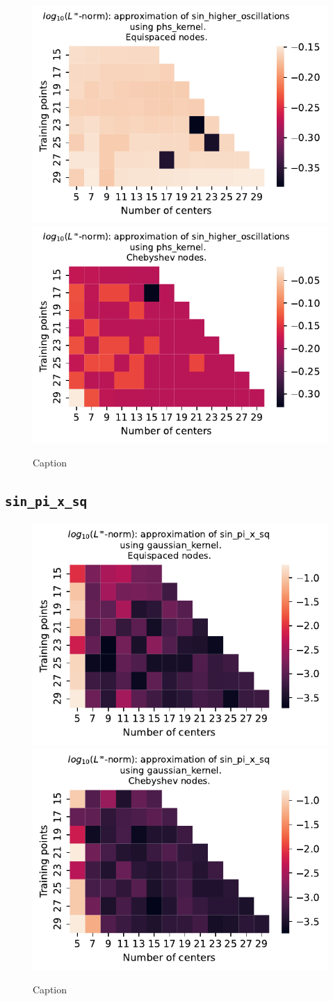 \documentclass[12pt]{report} %
\begin{document}
\begin{figure}[ht]
  \centering

  \includegraphics[width=.49\textwidth]{imagenes/experiments/1d/variational/sin_higher_oscillations-Kphs_kernel-Equi.pdf}
  \includegraphics[width=.49\textwidth]{imagenes/experiments/1d/variational/sin_higher_oscillations-Kphs_kernel-Cheb.pdf}
  \caption{Caption}
  \label{fig:sin-higher-oscillations-phs}
\end{figure}

\subsection*{\texttt{sin\_pi\_x\_sq}}

\begin{figure}[ht]
  \centering

  \includegraphics[width=.49\textwidth]{imagenes/experiments/1d/variational/sin_pi_x_sq-Kgaussian_kernel-Equi.pdf}
  \includegraphics[width=.49\textwidth]{imagenes/experiments/1d/variational/sin_pi_x_sq-Kgaussian_kernel-Cheb.pdf}
  \caption{Caption}
  \label{fig:sin-pi-x-sq-gaussian}
\end{figure}
\end{document}
